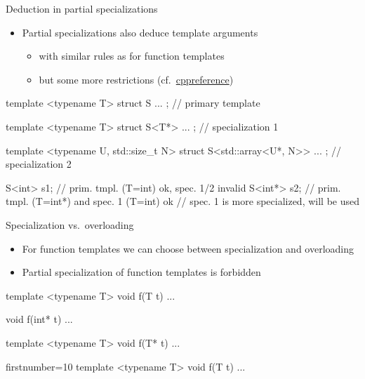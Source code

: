 \begin{advanced}
\begin{frame}[fragile]
  \begin{block}{Deduction in partial specializations}
    \begin{itemize}
      \item Partial specializations also deduce template arguments
      \begin{itemize}
        \item with similar rules as for function templates
        \item but some more restrictions (cf.\ \href{https://en.cppreference.com/w/cpp/language/partial_specialization}{cppreference})
      \end{itemize}
    \end{itemize}
  \end{block}
  \small
  \begin{cppcode*}{}
    template <typename T>
    struct S { ... }; // primary template

    template <typename T>
    struct S<T*> { ... }; // specialization 1

    template <typename U, std::size_t N>
    struct S<std::array<U*, N>> { ... }; // specialization 2

    S<int>  s1; // prim. tmpl. (T=int) ok, spec. 1/2 invalid
    S<int*> s2; // prim. tmpl. (T=int*) and spec. 1 (T=int) ok
                // spec. 1 is more specialized, will be used
  \end{cppcode*}
\end{frame}

\begin{frame}[fragile]
  \begin{block}{Specialization vs.\ overloading}
    \begin{itemize}
      \item For function templates we can choose between specialization and overloading
      \item Partial specialization of function templates is forbidden
    \end{itemize}
  \end{block}
  \small
  \begin{multicols}{2}
    \begin{cppcode*}{}
      template <typename T>
      void f(T t) { ... }


      void f(int* t) { ... }


      template <typename T>
      void f(T* t) { ... }
    \end{cppcode*}
    \columnbreak
    \begin{cppcode*}{firstnumber=10}
      template <typename T>
      void f(T t) { ... }


\end{cppcode*}
\end{multicols}
\end{frame}
\end{advanced}
